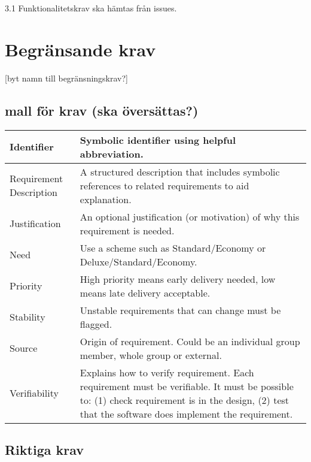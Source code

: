 \documentclass[a4paper, twoside, 11pt, titlepage]{article}
\begin{document}
3.1 Funktionalitetskrav ska hämtas från issues.

\section{Begränsande krav}

[byt namn till begränsningskrav?]

	\subsection{mall för krav (ska översättas?)}

	\begin{tabular} { | l | l | }
		\hline
		Identifier & Symbolic identifier using helpful abbreviation.  \\
		\hline
		Requirement Description & A structured description that includes symbolic references to related requirements to aid explanation.  \\
		\hline
		Justification & An optional justification (or motivation) of why this requirement is needed.  \\
		\hline
		Need & Use a scheme such as Standard/Economy or Deluxe/Standard/Economy.  \\
		\hline
		Priority & High priority means early delivery needed, low means late delivery acceptable.  \\
		\hline
		Stability & Unstable requirements that can change must be flagged.   \\
		\hline
		Source & Origin of requirement. Could be an individual group member, whole group or external.  \\
		\hline
		Verifiability & Explains how to verify requirement. Each requirement must be verifiable. It must be possible to: (1) check requirement is in the design, (2) test that the software does implement the requirement.  \\
		\hline
	\end{tabular}

	\subsection{Riktiga krav}
\end{document}
